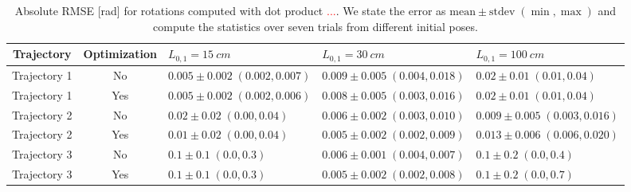 \begin{table}\small
\centering
\caption{Absolute \gls{RMSE} [rad] for rotations computed with dot product \textcolor{red}{...}. We state the error as $\text{mean} \pm \text{stdev} \; (\min, \max)$ and compute the statistics over seven trials from different initial poses.}
\begin{tabular}{cclll}\toprule
\textbf{Trajectory} & \textbf{Optimization} & $L_{0,1} = \SI{15}{cm}$ & $L_{0,1} = \SI{30}{cm}$ & $L_{0,1} = \SI{100}{cm}$\\
\midrule
    Trajectory 1 & No & $0.005 \pm 0.002 \; (0.002, 0.007)$ & $0.009 \pm 0.005 \; (0.004, 0.018)$ & $0.02 \pm 0.01 \; (0.01, 0.04)$ \\
    Trajectory 1 & Yes & $0.005 \pm 0.002 \; (0.002, 0.006)$ & $0.008 \pm 0.005 \; (0.003, 0.016)$ & $0.02 \pm 0.01 \; (0.01, 0.04)$ \\
    \midrule
    Trajectory 2 & No & $0.02 \pm 0.02 \; (0.00, 0.04)$ & $0.006 \pm 0.002 \; (0.003, 0.010)$ & $0.009 \pm 0.005 \; (0.003, 0.016)$ \\
    Trajectory 2 & Yes & $0.01 \pm 0.02 \; (0.00, 0.04)$ & $0.005 \pm 0.002 \; (0.002, 0.009)$ & $0.013 \pm 0.006 \; (0.006, 0.020)$ \\
    \midrule
    Trajectory 3 & No & $0.1 \pm 0.1 \; (0.0, 0.3)$ & $0.006 \pm 0.001 \; (0.004, 0.007)$ & $0.1 \pm 0.2 \; (0.0, 0.4)$ \\
    Trajectory 3 & Yes & $0.1 \pm 0.1 \; (0.0, 0.3)$ & $0.005 \pm 0.002 \; (0.002, 0.008)$ & $0.1 \pm 0.2 \; (0.0, 0.7)$ \\
\bottomrule
\end{tabular}
\label{tab:srslam:results_simulations_rotation_z_angle}
\end{table}
\fi

